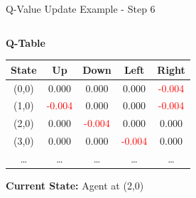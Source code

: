 \documentclass[aspectratio=169]{beamer}
\begin{document}
\begin{frame}{Q-Value Update Example - Step 6}
    
    \begin{columns}
        \begin{column}{0.45\textwidth}
            \textbf{Q-Table}
            \small
            \begin{table}[h]
                \centering
                \begin{tabular}{|c|c|c|c|c|}
                    \hline
                    \textbf{State} & \textbf{Up} & \textbf{Down} & \textbf{Left} & \textbf{Right} \\
                    \hline
                    (0,0) & 0.000 & 0.000 & 0.000 & \textcolor{red}{-0.004} \\
                    (1,0) & \textcolor{red}{-0.004} & 0.000 & 0.000 & \textcolor{red}{-0.004} \\
                    (2,0) & 0.000 & \textcolor{red}{-0.004} & 0.000 & 0.000 \\
                    (3,0) & 0.000 & 0.000 & \textcolor{red}{-0.004} & 0.000 \\
                    \dots & \dots & \dots & \dots & \dots \\
                    \hline
                \end{tabular}
            \end{table}
            
            \textbf{Current State:} Agent at (2,0)


        \end{column}
        

\end{columns}
\end{frame}
\end{document}
